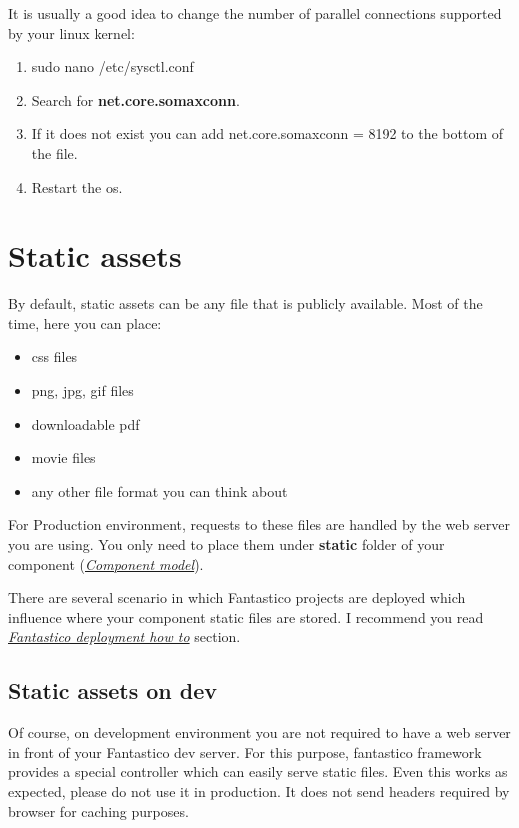 \documentclass[letterpaper,10pt,english]{sphinxmanual}
\begin{document}
It is usually a good idea to change the number of parallel connections supported by your linux kernel:
\begin{enumerate}
\item {} 
sudo nano /etc/sysctl.conf

\item {} 
Search for \textbf{net.core.somaxconn}.

\item {} 
If it does not exist you can add net.core.somaxconn = 8192 to the bottom of the file.

\item {} 
Restart the os.

\end{enumerate}


\section{Static assets}
\label{how_to/static_assets:static-assets}\label{how_to/static_assets::doc}
By default, static assets can be any file that is publicly available. Most of the time, here you can place:
\begin{itemize}
\item {} 
css files

\item {} 
png, jpg, gif files

\item {} 
downloadable pdf

\item {} 
movie files

\item {} 
any other file format you can think about

\end{itemize}

For Production environment, requests to these files are handled by the web server you are using. You only need to
place them under \textbf{static} folder of your component ({\hyperref[features/component_model::doc]{\emph{Component model}}}).

There are several scenario in which Fantastico projects are deployed which influence where your component static files
are stored. I recommend you read {\hyperref[how_to/deployment_how_to::doc]{\emph{Fantastico deployment how to}}} section.


\subsection{Static assets on dev}
\label{how_to/static_assets:static-assets-on-dev}
Of course, on development environment you are not required to have a web server in front of your Fantastico dev server.
For this purpose, fantastico framework provides a special controller which can easily serve static files. Even this
works as expected, please do not use it in production. It does not send headers required by browser for caching
purposes.
\end{document}

